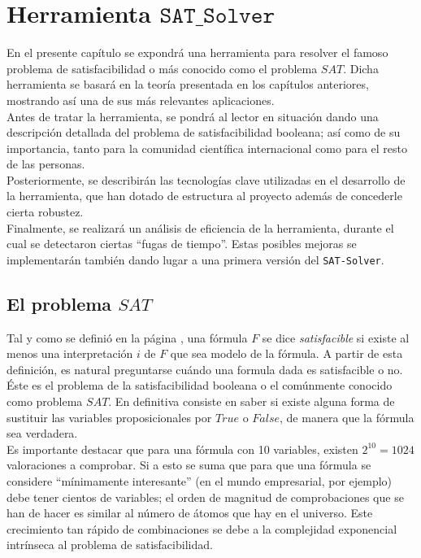 \chapter{Herramienta $\mathtt{SAT\_Solver}$}

En el presente capítulo se expondrá una herramienta para resolver el famoso problema de satisfacibilidad o más conocido como el problema $SAT$. Dicha herramienta se basará en la teoría presentada en los capítulos anteriores, mostrando así una de sus más relevantes aplicaciones. \\

Antes de tratar la herramienta, se pondrá al lector en situación dando una descripción detallada del problema de satisfacibilidad booleana; así como de su importancia, tanto para la comunidad científica internacional como para el resto de las personas.\\

Posteriormente, se describirán las tecnologías clave utilizadas en el desarrollo de la herramienta, que han dotado de estructura al proyecto además de concederle cierta robustez.\\

Finalmente, se realizará un análisis de eficiencia de la herramienta, durante el cual se detectaron ciertas ``fugas de tiempo''. Estas posibles mejoras se implementarán también dando lugar a una primera versión del \texttt{SAT-Solver}.

\newpage
\section{El problema $SAT$}

Tal y como se definió en la página \pageref{def:sat}, una fórmula $F$ se dice \textit{satisfacible} si existe al menos una interpretación $i$ de $F$ que sea modelo de la fórmula. A partir de esta definición, es natural preguntarse cuándo una formula dada es satisfacible o no. Éste es el problema de la satisfacibilidad booleana o el comúnmente conocido como problema $SAT$. En definitiva consiste en saber si existe alguna forma de sustituir las variables proposicionales por $True$ o $False$, de manera que la fórmula sea verdadera. \\

Es importante destacar que para una fórmula con 10 variables, existen $2^{10} = 1024$ valoraciones a comprobar. Si a esto se suma que para que una fórmula se considere ``mínimamente interesante'' (en el mundo empresarial, por ejemplo) debe tener cientos de variables; el orden de magnitud de comprobaciones que se han de hacer es similar al número de átomos que hay en el universo. Este crecimiento tan rápido de combinaciones se debe a la complejidad exponencial intrínseca al problema de satisfacibilidad. \\

